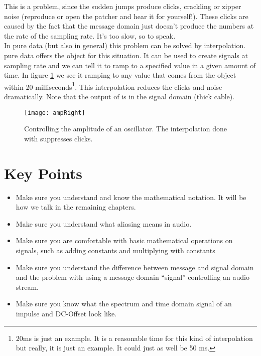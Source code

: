 This is a problem, since the sudden jumps produce clicks, crackling or zipper noise (reproduce or open the patcher and hear it for yourself!). These clicks are caused by the fact that the message domain just doesn't produce
the numbers at the rate of the sampling rate. It's too slow, so to speak.\\
In pure data (but also in general) this problem can be solved by interpolation. pure data offers the  object for this situation. It can be used to create signals at sampling rate and we can tell it to ramp to a specified value in a given amount of time. In figure \ref{fig:ampRight} we see it ramping to any value that comes from the  object within 20 milliseconds\footnote{20ms is just an example. It is a reasonable time for this kind of interpolation but really, it is just an example. It could just as well be 50 ms.}. This interpolation reduces the clicks and noise dramatically. Note that the output of  is in the signal domain (thick cable).

\begin{figure}[H]
	\centering
	\texttt{[image: ampRight]}
	\caption[shortCaption]
	{Controlling the amplitude of an oscillator. The interpolation done with  suppresses clicks. }
	\label{fig:ampRight}
\end{figure}


\section{Key Points}
\begin{itemize}
	\item Make sure you understand and know the mathematical notation. It will be how we talk in the remaining chapters.
	\item Make sure you understand what aliasing means in audio.
	\item Make sure you are comfortable with basic mathematical operations on signals, such as adding constants and multiplying with constants
	\item Make sure you understand the difference between message and signal domain and the problem with using a message domain ``signal'' controlling an audio stream.
	\item Make sure you know what the spectrum and time domain signal of an impulse and DC-Offset look like.
\end{itemize}
